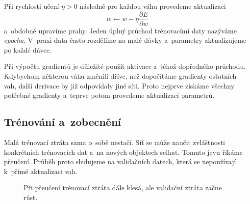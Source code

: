 Při rychlosti učení \(\eta>0\) následně pro každou váhu provedeme aktualizaci
\[
    w
    \gets
    w-\eta\frac{\partial E}{\partial w}
\]
a~obdobně upravíme prahy. Jeden úplný průchod trénovacími daty nazýváme \emph{epocha}. V~praxi data často rozdělíme na malé dávky a~parametry aktualizujeme po každé dávce.

Při výpočtu gradientů je důležité použít aktivace z~téhož dopředného průchodu. Kdybychom některou váhu změnili dříve, než dopočítáme gradienty ostatních vah, další derivace by již odpovídaly jiné síti. Proto nejprve získáme všechny potřebné gradienty a~teprve potom provedeme aktualizaci parametrů.

\begin{algorithm}
    \caption{\textsc{backpropagation}}
    \label{alg:ai-backpropagation}
\end{algorithm}

\subsection{Trénování a~zobecnění}

Malá trénovací ztráta sama o~sobě nestačí. Síť se může naučit zvláštnosti konkrétních trénovacích dat a~na nových objektech selhat. Tomuto jevu říkáme přeučení. Průběh proto sledujeme na validačních datech, která se nepoužívají k~přímé aktualizaci vah.

\begin{figure}[ht]
    \centering
    
    \caption{Při přeučení trénovací ztráta dále klesá, ale validační ztráta začne růst.}
    \label{fig:ai-preuceni}
\end{figure}

